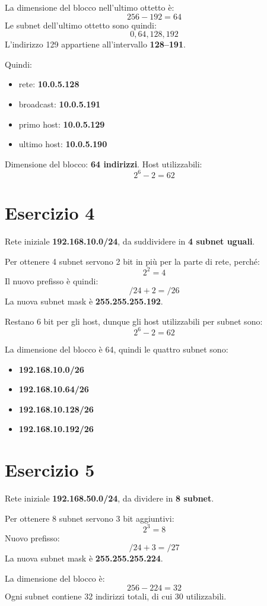 \documentclass[a4paper,12pt]{article}
\begin{document}
La dimensione del blocco nell'ultimo ottetto è:
\[
256 - 192 = 64
\]
Le subnet dell'ultimo ottetto sono quindi:
\[
0, 64, 128, 192
\]
L'indirizzo 129 appartiene all'intervallo \textbf{128--191}.

Quindi:
\begin{itemize}
    \item rete: \textbf{10.0.5.128}
    \item broadcast: \textbf{10.0.5.191}
    \item primo host: \textbf{10.0.5.129}
    \item ultimo host: \textbf{10.0.5.190}
\end{itemize}

Dimensione del blocco: \textbf{64 indirizzi}. Host utilizzabili:
\[
2^6 - 2 = 62
\]

\section*{Esercizio 4}
Rete iniziale \textbf{192.168.10.0/24}, da suddividere in \textbf{4 subnet uguali}.

Per ottenere 4 subnet servono 2 bit in più per la parte di rete, perché:
\[
2^2 = 4
\]
Il nuovo prefisso è quindi:
\[
/24 + 2 = /26
\]
La nuova subnet mask è \textbf{255.255.255.192}.

Restano 6 bit per gli host, dunque gli host utilizzabili per subnet sono:
\[
2^6 - 2 = 62
\]

La dimensione del blocco è 64, quindi le quattro subnet sono:
\begin{itemize}
    \item \textbf{192.168.10.0/26}
    \item \textbf{192.168.10.64/26}
    \item \textbf{192.168.10.128/26}
    \item \textbf{192.168.10.192/26}
\end{itemize}

\section*{Esercizio 5}
Rete iniziale \textbf{192.168.50.0/24}, da dividere in \textbf{8 subnet}.

Per ottenere 8 subnet servono 3 bit aggiuntivi:
\[
2^3 = 8
\]
Nuovo prefisso:
\[
/24 + 3 = /27
\]
La nuova subnet mask è \textbf{255.255.255.224}.

La dimensione del blocco è:
\[
256 - 224 = 32
\]
Ogni subnet contiene 32 indirizzi totali, di cui 30 utilizzabili.
\end{document}
